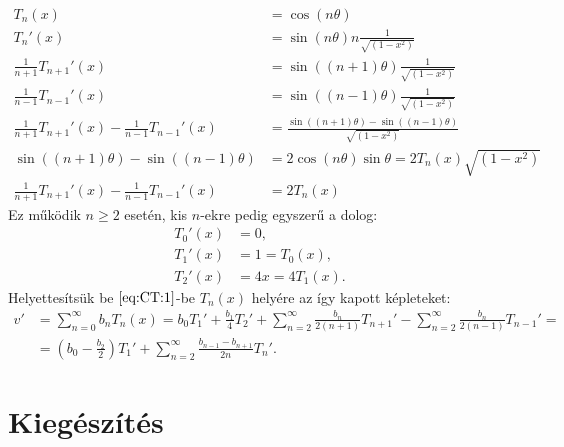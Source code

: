 \documentclass[oneside, titlepage, 12pt, a4paper]{report}
\begin{document}
\begin{align*}
T_n (x) &= \cos(n \theta) \\
T_n' (x) &= \sin(n \theta) n \frac{1}{\sqrt{(1 - x^2)}} \\
\frac{1}{n+1} T_{n+1}' (x) &= \sin((n+1) \theta) \frac{1}{\sqrt{(1 - x^2)}} \\
\frac{1}{n-1} T_{n-1}' (x) &= \sin((n-1) \theta) \frac{1}{\sqrt{(1 - x^2)}} \\
\frac{1}{n+1} T_{n+1}' (x) - \frac{1}{n-1} T_{n-1}' (x) &= \frac{\sin((n+1) \theta) - \sin((n-1) \theta)}{\sqrt{(1 - x^2)}} \\
\sin((n+1) \theta) - \sin((n-1) \theta) &= 2 \cos(n \theta) \sin\theta = 2 T_n(x) \sqrt{(1 - x^2)} \\
\frac{1}{n+1} T_{n+1}' (x) - \frac{1}{n-1} T_{n-1}' (x) &= 2 T_n(x)
\end{align*}
Ez működik $n \geq 2$ esetén, kis $n$-ekre pedig egyszerű a dolog:
\begin{align*}
T_0' (x) &= 0, \\
T_1' (x) &= 1 = T_0(x), \\
T_2' (x) &= 4x = 4 T_1(x).
\end{align*}
Helyettesítsük be $\eqref{eq:CT:1}$-be $T_n(x)$ helyére az így kapott képleteket:
\begin{align*}
v' &= \sum_{n = 0}^\infty b_n T_n(x) = b_0 T_1' + \frac{b_1}{4} T_2' + \sum_{n=2}^\infty \frac{b_n}{2(n+1)} T_{n+1}' - \sum_{n=2}^\infty \frac{b_n}{2(n-1)} T_{n-1}' = \\
 &= \left( b_0 - \frac{b_2}{2} \right) T_1' + \sum_{n=2}^\infty \frac{b_{n-1} - b_{n+1}}{2n} T_n'.
\end{align*}







\section{Kiegészítés} %


 

 
\end{document}
